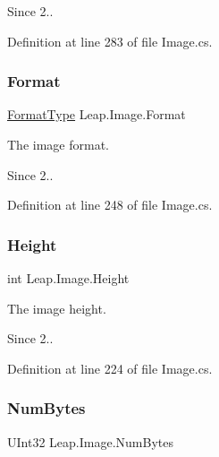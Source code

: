 \begin{DoxySince}{Since}
2.. 
\end{DoxySince}


Definition at line 283 of file Image.\+cs.

\mbox{\label{class_leap_1_1_image_a87defbae65a250428b3b938b9ff7ae22}} 
\subsubsection{\texorpdfstring{Format}{Format}}
{\footnotesize\ttfamily \mbox{\hyperlink{class_leap_1_1_image_acefbe5d3803afc9f433a6e3856d242d1}{Format\+Type}} Leap.\+Image.\+Format\hspace{0.3cm}{\ttfamily [get]}}



The image format. 

\begin{DoxySince}{Since}
2.. 
\end{DoxySince}


Definition at line 248 of file Image.\+cs.

\mbox{\label{class_leap_1_1_image_a00971100533a392e69ed78069340954b}} 
\subsubsection{\texorpdfstring{Height}{Height}}
{\footnotesize\ttfamily int Leap.\+Image.\+Height\hspace{0.3cm}{\ttfamily [get]}}



The image height. 

\begin{DoxySince}{Since}
2.. 
\end{DoxySince}


Definition at line 224 of file Image.\+cs.

\mbox{\label{class_leap_1_1_image_a531668f24d32026f61ef2affb12be758}} 
\subsubsection{\texorpdfstring{NumBytes}{NumBytes}}
{\footnotesize\ttfamily U\+Int32 Leap.\+Image.\+Num\+Bytes\hspace{0.3cm}{\ttfamily [get]}}



